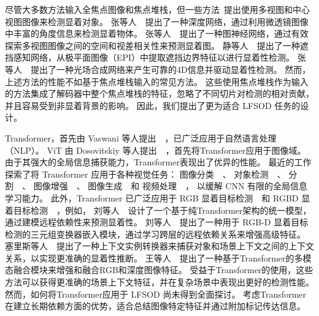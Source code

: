 尽管大多数方法输入全焦点图像和焦点堆栈，但一些方法\cite{jing2021occlusion, wang2022lfbcnet, zhang2022exploring}~提出使用多视图和中心视图图像来检测显着对象。 
张等人~\cite{zhang2020light}~提出了一种深度网络，通过利用微透镜图像中丰富的角度信息来检测显着物体。 
张等人~\cite{zhang2021geometry}~提出了一种图神经网络，通过有效探索多视图图像之间的空间和视差相关性来预测显着图。 
静等人~\cite{jing2021occlusion}~提出了一种遮挡感知网络，从极平面图像（EPI）中提取遮挡边界特征以进行显着性检测。 
张等人~\cite{zhang2022exploring}~提出了一种光场合成网络来产生可靠的4D信息并驱动显着性检测。 
然而，上述方法的性能不如基于焦点堆栈输入的常见方法。 
这些使用焦点堆栈作为输入的方法集成了解码器中整个焦点堆栈的特征，忽略了不同切片对检测的相对贡献，并且容易受到非显着背景的影响。 因此，我们提出了更为适合 LFSOD 任务的设计。




Transformer，首先由 Vaswani 等人提出~\cite{vaswani2017attention}~，已广泛应用于自然语言处理（NLP）。
ViT 由 Dosovitskiy 等人提出~\cite{dosovitskiy2020image}~，首先将Transformer应用于图像域。 由于其强大的全局信息捕获能力，Transformer表现出了优异的性能。
最近的工作探索了将 Transformer 应用于各种视觉任务：
图像分类~\cite{chen2020generative, dosovitskiy2020image}~、
对象检测~\cite{zhu2020deformable, dai2021up, sun2021rethinking}~、
分割~\cite{chen2021pre, wang2021end}~、
图像增强~\cite{yang2020learning, chen2021pre}~、
图像生成~\cite{parmar2018image}~和 
视频处理~\cite{zhou2018end, zheng2020end}~，
以缓解 CNN 有限的全局信息学习能力。 此外，Transformer 已广泛应用于 RGB 显着目标检测~\cite{liu2021visual, siris2021scene}~和 RGBD 显着目标检测~\cite{liu2021tritransnet, wang2021mutualformer}~，例如，
刘等人~\cite{liu2021visual}~设计了一个基于纯Transformer架构的统一模型，通过建模远程依赖性来预测显着性。 
刘等人~\cite{liu2021tritransnet}~提出了一种用于 RGB-D 显着目标检测的三元组变换器嵌入模块，通过学习跨层的远程依赖关系来增强高级特征。 
塞里斯等人~\cite{siris2021scene}~提出了一种上下文实例转换器来捕获对象和场景上下文之间的上下文关系，以实现更准确的显着性推断。 
王等人~\cite{wang2021mutualformer}~提出了一种基于Transformer的多模态融合模块来增强和融合RGB和深度图像特征。
受益于Transformer的使用，这些方法可以获得更准确的场景上下文特征，并在复杂场景中表现出更好的检测性能。 然而，如何将Transformer应用于 LFSOD 尚未得到全面探讨。 考虑Transformer在建立长期依赖方面的优势，适合总结图像特定特征并通过附加标记传达信息。




%
%




